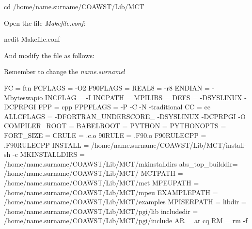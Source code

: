 \begin{bashcode}
cd /home/name.surname/COAWST/Lib/MCT
\end{bashcode}
\bigskip

\noindent Open the file \textit{Makefile.conf}:
\bigskip

\begin{bashcode}
nedit Makefile.conf
\end{bashcode}
\bigskip

\noindent And modify the file as follows:
\bigskip

\begin{tcolorbox}[enhanced,
  grow to left by=0cm,%
  grow to right by=0cm,%
  enlarge top by=0cm,%
  enlarge bottom by=0cm,%
  tcbox raise base,
  boxrule=1.0pt,
  left=18mm,
  colframe=red!50!black,coltext=red!25!black,colback=red!10!white,
  overlay={\begin{tcbclipinterior}\fill[red!75!blue!50!white] (frame.south west)
    rectangle node[text=white,font=\sffamily\bfseries\footnotesize,rotate=0] {WARNING} ([xshift=18mm]frame.north west);\end{tcbclipinterior}}]
    Remember to change the \textit{name.surname}!
\end{tcolorbox}
\bigskip

\begin{bashcode}
FC  	    = ftn
FCFLAGS	 = -O2
F90FLAGS        = 
REAL8           = -r8
ENDIAN          = -Mbyteswapio
INCFLAG         = -I
INCPATH         =
MPILIBS         = 
DEFS            = -DSYSLINUX -DCPRPGI
FPP	     = cpp
FPPFLAGS        = -P -C -N -traditional
CC              = cc
ALLCFLAGS       = -DFORTRAN_UNDERSCORE_ -DSYSLINUX -DCPRPGI -O
COMPILER_ROOT   = 
BABELROOT       = 
PYTHON          = 
PYTHONOPTS      = 
FORT_SIZE       = 
CRULE           = .c.o
90RULE          = .F90.o
F90RULECPP      = .F90RULECPP
INSTALL         = /home/name.surname/COAWST/Lib/MCT/install-sh -c
MKINSTALLDIRS   = /home/name.surname/COAWST/Lib/MCT/mkinstalldirs
abs_top_builddir= /home/name.surname/COAWST/Lib/MCT/
MCTPATH         = /home/name.surname/COAWST/Lib/MCT/mct
MPEUPATH        = /home/name.surname/COAWST/Lib/MCT/mpeu
EXAMPLEPATH     = /home/name.surname/COAWST/Lib/MCT/examples
MPISERPATH      = 
libdir          = /home/name.surname/COAWST/Lib/MCT/pgi/lib
includedir      = /home/name.surname/COAWST/Lib/MCT/pgi/include
AR	      = ar cq
RM	      = rm -f
\end{bashcode}
\bigskip

